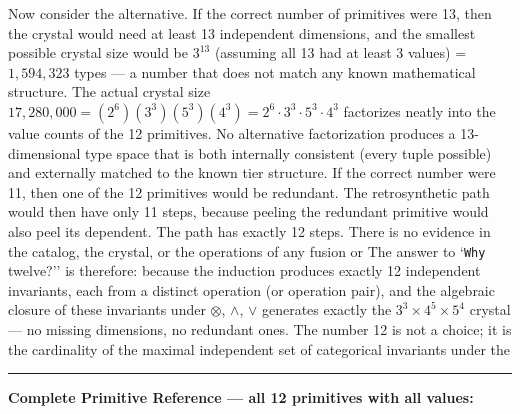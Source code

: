 \documentclass[12pt,a4paper]{article}
\begin{document}
Now consider the alternative. If the correct number of primitives were 13, then the crystal would need at least 13
independent dimensions, and the smallest possible crystal size would be $3^{13}$ (assuming all 13 had at least 3
values) = $1{,}594{,}323$ types --- a number that does not match any known mathematical structure. The actual crystal
size $17{,}280{,}000 = (2^6)(3^3)(5^3)(4^3) = 2^6 \cdot 3^3 \cdot 5^3 \cdot 4^3$ factorizes neatly into the value
counts of the 12 primitives. No alternative factorization produces a 13-dimensional type space that is both internally
consistent (every tuple possible) and externally matched to the known tier structure.
If the correct number were 11, then one of the 12 primitives would be redundant. The retrosynthetic path would then
have only 11 steps, because peeling the redundant primitive would also peel its dependent. The path has exactly 12
steps. There is no evidence in the catalog, the crystal, or the operations of any fusion or
The answer to `\texttt{Why} twelve?'' is therefore: because the induction produces exactly 12 independent invariants, each from
a distinct operation (or operation pair), and the algebraic closure of these invariants under
$\otimes$, $\wedge$,
$\vee$ generates exactly the $3^3 \times 4^5 \times 5^4$ crystal --- no missing dimensions, no redundant ones. The
number 12 is not a choice; it is the cardinality of the maximal independent set of categorical invariants under the

\begin{center}
\rule{0.5\textwidth}{0.4pt}
\end{center}

\textbf{Complete Primitive Reference --- all 12 primitives with all values:}
\end{document}
